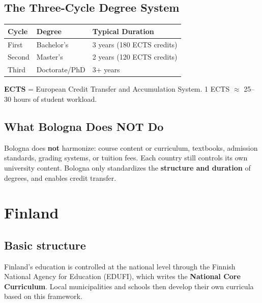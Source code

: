 \section{The Three-Cycle Degree System}


\begin{center}\small
	\begin{tabularx}{0.85\textwidth}{@{} l l X @{}}
		\toprule
		\textbf{Cycle} & \textbf{Degree} & \textbf{Typical Duration}  \\
		\midrule
		First          & Bachelor's      & 3 years (180 ECTS credits) \\
		Second         & Master's        & 2 years (120 ECTS credits) \\
		Third          & Doctorate/PhD   & 3+ years                   \\
		\bottomrule
	\end{tabularx}
\end{center}

\textbf{ECTS} = European Credit Transfer and Accumulation System. 1 ECTS $\approx$ 25--30 hours of student workload.


\section{What Bologna Does NOT Do}

Bologna does \textbf{not} harmonize: course content or curriculum, textbooks, admission standards, grading systems, or tuition fees. Each country still controls its own university content. Bologna only standardizes the \textbf{structure and duration} of degrees, and enables credit transfer.



\chapter{Finland}


\section{Basic structure}

Finland's education is controlled at the national level through the Finnish National Agency for Education (EDUFI), which writes the \textbf{National Core Curriculum}. Local municipalities and schools then develop their own curricula based on this framework.

